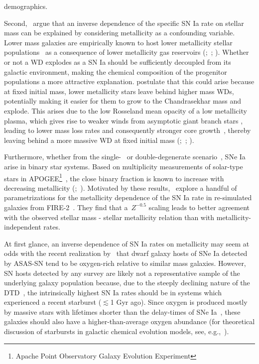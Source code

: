 \documentclass[ms.tex]{subfiles}
\begin{document}
demographics.
\par
Second,~\citet{Kistler2013} argue that an inverse dependence of the
specific SN Ia rate on stellar mass can be explained by considering metallicity
as a confounding variable.
Lower mass galaxies are empirically known to host lower metallicity stellar
populations~\citep{Gallazzi2005, Kirby2013} as a consequence of lower
metallicity gas reservoirs (\citealp{Tremonti2004};~\citealp*{Zahid2011};
\citealp{Andrews2013, Zahid2014}).
Whether or not a WD explodes as a SN Ia should be sufficiently decoupled from
its galactic environment, making the chemical composition of the progenitor
populations a more attractive explanation.
\citet{Kistler2013} postulate that this could arise because at fixed initial
mass, lower metallicity stars leave behind higher mass WDs, potentially making
it easier for them to grow to the Chandrasekhar mass and explode.
This arises due to the low Rosseland mean opacity of a low metallicity plasma,
which gives rise to weaker winds from asymptotic giant branch stars
\citep{Willson2000, Marigo2007}, leading to lower mass loss rates and
consequently stronger core growth~\citep{Kalirai2014}, thereby leaving behind a
more massive WD at fixed initial mass (\citealp{Umeda1999};~\citealp*{Meng2008};
\citealp{Zhao2012}).
\par
Furthermore, whether from the single-~\citep[e.g.][]{Whelan1973} or
double-degenerate scenario~\citep[e.g.][]{Iben1984, Webbink1984}, SNe Ia arise
in binary star systems.
Based on multiplicity measurements of solar-type stars in APOGEE\footnote{
	Apache Point Observatory Galaxy Evolution Experiment
}~\citep{Majewski2017}, the close binary fraction is known to increase with
decreasing metallicity (\citealp{Badenes2018};~\citealp*{Moe2019}).
Motivated by these results,~\citet{Gandhi2022} explore a handful of
parametrizations for the metallicity dependence of the SN Ia rate in
re-simulated galaxies from FIRE-2~\citep{Hopkins2018}.
They find that a~$Z^{-0.5}$ scaling leads to better agreement with the observed
stellar mass - stellar metallicity relation than with metallicity-independent
rates.
\par
At first glance, an inverse dependence of SN Ia rates on metallicity may seem
at odds with the recent realization by~\citet{Holoien2022} that dwarf galaxy
hosts of SNe Ia detected by ASAS-SN tend to be oxygen-rich relative to similar
mass galaxies.
However, SN hosts detected by any survey are likely not a representative sample
of the underlying galaxy population because, due to the steeply declining
nature of the DTD~\citep[e.g.][]{Maoz2012a}, the intrinsically highest SN Ia
rates should be in systems which experienced a recent starburst ($\lesssim$1
Gyr ago).
Since oxygen is produced mostly by massive stars with lifetimes shorter than
the delay-times of SNe Ia~\citep*[e.g.][]{Hurley2000, Johnson2019}, these
galaxies should also have a higher-than-average oxygen abundance (for
theoretical discussion of starbursts in galactic chemical evolution models,
see, e.g.,~\citealt{Johnson2020}).
\end{document}
